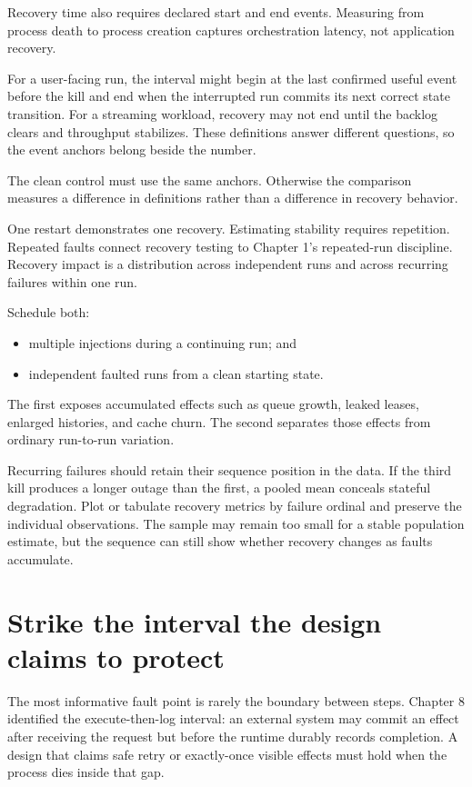 Recovery time also requires declared start and end events. Measuring from process death to process creation captures orchestration latency, not application recovery.

For a user-facing run, the interval might begin at the last confirmed useful event before the kill and end when the interrupted run commits its next correct state transition. For a streaming workload, recovery may not end until the backlog clears and throughput stabilizes. These definitions answer different questions, so the event anchors belong beside the number.

The clean control must use the same anchors. Otherwise the comparison measures a difference in definitions rather than a difference in recovery behavior.

One restart demonstrates one recovery. Estimating stability requires repetition. Repeated faults connect recovery testing to Chapter 1's repeated-run discipline. Recovery impact is a distribution across independent runs and across recurring failures within one run.

Schedule both:

\begin{itemize}
\tightlist
\item
  multiple injections during a continuing run; and
\item
  independent faulted runs from a clean starting state.
\end{itemize}

The first exposes accumulated effects such as queue growth, leaked leases, enlarged histories, and cache churn. The second separates those effects from ordinary run-to-run variation.

Recurring failures should retain their sequence position in the data. If the third kill produces a longer outage than the first, a pooled mean conceals stateful degradation. Plot or tabulate recovery metrics by failure ordinal and preserve the individual observations. The sample may remain too small for a stable population estimate, but the sequence can still show whether recovery changes as faults accumulate.

\section{Strike the interval the design claims to protect}\label{strike-the-interval-the-design-claims-to-protect}

The most informative fault point is rarely the boundary between steps. Chapter 8 identified the execute-then-log interval: an external system may commit an effect after receiving the request but before the runtime durably records completion. A design that claims safe retry or exactly-once visible effects must hold when the process dies inside that gap.

